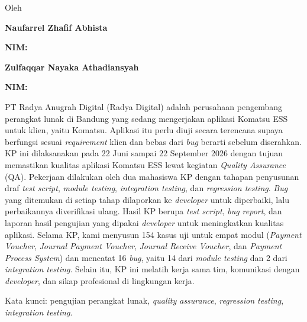 \clearpage
{}
\begin{center}
{\bfseries\large \JudulLaporan\par
\bfseries\large \TempatKP\par}
\vspace{0.1cm}
{Oleh\par
\bfseries\large Naufarrel Zhafif Abhista\par
\bfseries\large NIM: \NIM\par
\vspace{0.3cm}
\bfseries\large Zulfaqqar Nayaka Athadiansyah\par
\bfseries\large NIM: \NIMDua\par}
\end{center}
\vspace{1.1cm}

PT Radya Anugrah Digital (Radya Digital) adalah perusahaan pengembang perangkat lunak di Bandung yang sedang mengerjakan aplikasi Komatsu ESS untuk klien, yaitu Komatsu. Aplikasi itu perlu diuji secara terencana supaya berfungsi sesuai \textit{requirement} klien dan bebas dari \textit{bug} berarti sebelum diserahkan. KP ini dilaksanakan pada 22 Juni sampai 22 September 2026 dengan tujuan memastikan kualitas aplikasi Komatsu ESS lewat kegiatan \textit{Quality Assurance} (QA). Pekerjaan dilakukan oleh dua mahasiswa KP dengan tahapan penyusunan draf \textit{test script}, \textit{module testing}, \textit{integration testing}, dan \textit{regression testing}. \textit{Bug} yang ditemukan di setiap tahap dilaporkan ke \textit{developer} untuk diperbaiki, lalu perbaikannya diverifikasi ulang. Hasil KP berupa \textit{test script}, \textit{bug report}, dan laporan hasil pengujian yang dipakai \textit{developer} untuk meningkatkan kualitas aplikasi. Selama KP, kami menyusun 154 kasus uji untuk empat modul (\textit{Payment Voucher}, \textit{Journal Payment Voucher}, \textit{Journal Receive Voucher}, dan \textit{Payment Process System}) dan mencatat 16 \textit{bug}, yaitu 14 dari \textit{module testing} dan 2 dari \textit{integration testing}. Selain itu, KP ini melatih kerja sama tim, komunikasi dengan \textit{developer}, dan sikap profesional di lingkungan kerja.

Kata kunci: pengujian perangkat lunak, \textit{quality assurance}, \textit{regression testing}, \textit{integration testing}.
